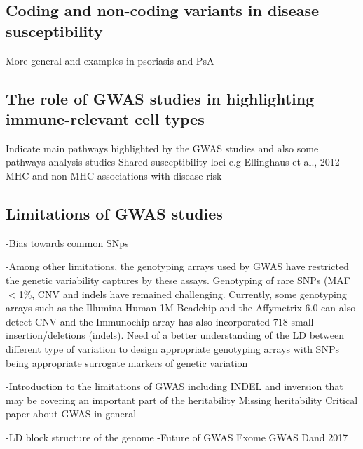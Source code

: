 \subsection{Coding and non-coding variants in disease susceptibility}
More general and examples in psoriasis and PsA

\subsection{The role of GWAS studies in highlighting immune-relevant cell types}
Indicate main pathways highlighted by the GWAS studies and also some pathways analysis studies
Shared susceptibility loci e.g Ellinghaus et al., 2012
MHC and non-MHC associations with disease risk

\subsection{Limitations of GWAS studies}
-Bias towards common SNps

-Among other limitations, the genotyping arrays used by GWAS have restricted the genetic variability captures by these assays. Genotyping of rare SNPs (MAF${<}$1\%, CNV and indels have remained challenging. Currently, some genotyping arrays such as the Illumina Human 1M Beadchip and the Affymetrix 6.0 can also detect CNV \parencite{Ku2010} and the Immunochip array has also incorporated 718 small insertion/deletions (indels).
	Need of a better understanding of the LD between different type of variation to design appropriate genotyping arrays with SNPs being appropriate surrogate markers of genetic variation

-Introduction to the limitations of GWAS including INDEL and inversion that may be covering an important part of the heritability
	Missing heritability
	Critical paper about GWAS in general

-LD block structure of the genome
-Future of GWAS Exome GWAS
	Dand 2017


	

	


